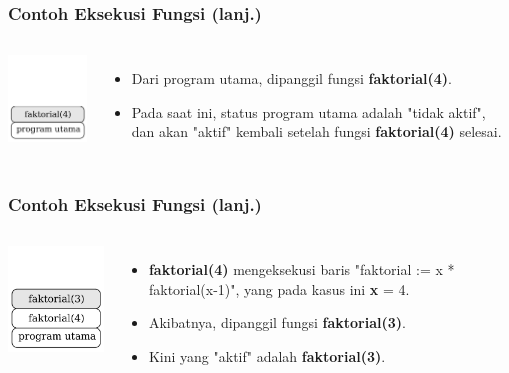 \begin{frame}
\frametitle{Contoh Eksekusi Fungsi (lanj.)}
\begin{columns}
    \centering
    \includegraphics[width=4cm]{asset/rekursi-2.pdf}
    \begin{itemize}
      \item Dari program utama, dipanggil fungsi \textbf{faktorial(4)}.
      \item Pada saat ini, status program utama adalah "tidak aktif", dan akan "aktif" kembali setelah fungsi \textbf{faktorial(4)} selesai.
    \end{itemize}
  \end{columns} 
\end{frame}

\begin{frame}
\frametitle{Contoh Eksekusi Fungsi (lanj.)}
\begin{columns}
    \centering
    \includegraphics[width=4cm]{asset/rekursi-3.pdf}
    \begin{itemize}
      \item \textbf{faktorial(4)} mengeksekusi baris "faktorial := x * faktorial(x-1)", yang pada kasus ini \textbf{x} = 4.
      \item Akibatnya, dipanggil fungsi \textbf{faktorial(3)}. 
      \item Kini yang "aktif" adalah \textbf{faktorial(3)}.
    \end{itemize}
  \end{columns} 
\end{frame}

